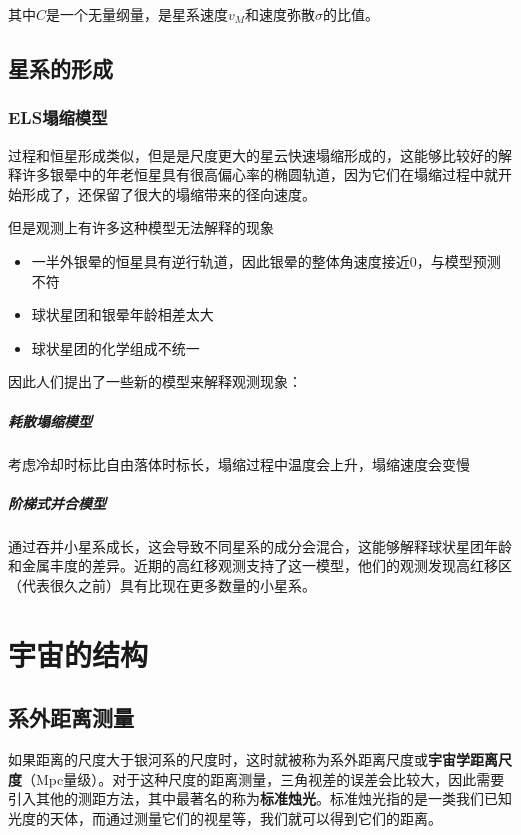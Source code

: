 \documentclass[openany]{ctexbook}
\begin{document}
其中$C$是一个无量纲量，是星系速度$v_M$和速度弥散$\sigma$的比值。

\section{星系的形成}
\subsection{ELS塌缩模型}
过程和恒星形成类似，但是是尺度更大的星云快速塌缩形成的，这能够比较好的解释许多银晕中的年老恒星具有很高偏心率的椭圆轨道，因为它们在塌缩过程中就开始形成了，还保留了很大的塌缩带来的径向速度。

但是观测上有许多这种模型无法解释的现象
\begin{itemize}
  \item 一半外银晕的恒星具有逆行轨道，因此银晕的整体角速度接近0，与模型预测不符
  \item 球状星团和银晕年龄相差太大
  \item 球状星团的化学组成不统一
\end{itemize}

因此人们提出了一些新的模型来解释观测现象：
\paragraph{耗散塌缩模型}
考虑冷却时标比自由落体时标长，塌缩过程中温度会上升，塌缩速度会变慢

\paragraph{阶梯式并合模型}
通过吞并小星系成长，这会导致不同星系的成分会混合，这能够解释球状星团年龄和金属丰度的差异。近期的高红移观测支持了这一模型，他们的观测发现高红移区（代表很久之前）具有比现在更多数量的小星系。

\chapter{宇宙的结构}
\section{系外距离测量}
如果距离的尺度大于银河系的尺度时，这时就被称为系外距离尺度或\textbf{宇宙学距离尺度}（Mpc量级）。对于这种尺度的距离测量，三角视差的误差会比较大，因此需要引入其他的测距方法，其中最著名的称为\textbf{标准烛光}。标准烛光指的是一类我们已知光度的天体，而通过测量它们的视星等，我们就可以得到它们的距离。
\end{document}
